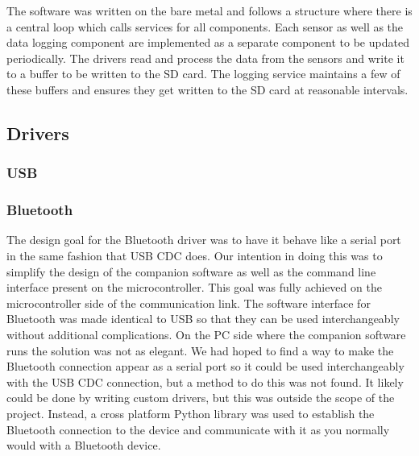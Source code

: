 The software was written on the bare metal and follows a structure where there
is a central loop which calls services for all components.  Each sensor as well
as the data logging component are implemented as a separate component
to be updated periodically. The drivers read and process the data from the
sensors and write it to a buffer to be written to the SD card. The logging service
maintains a few of these buffers and ensures they get written to the SD card
at reasonable intervals.

\subsection{Drivers}

\subsubsection{USB}

\subsubsection{Bluetooth}

The design goal for the Bluetooth driver was to have it behave like a serial
port in the same fashion that USB CDC does. Our intention in doing this was to 
simplify the design of the companion software as well as the command line 
interface present on the microcontroller. This goal was fully achieved 
on the microcontroller side of the communication link. The software interface for 
Bluetooth was made identical to USB so that they can be used interchangeably 
without additional complications. On the PC side where the companion software
runs the solution was not as elegant. We had hoped to find a way to make the
Bluetooth connection appear as a serial port so it could be used interchangeably
with the USB CDC connection, but a method to do this was not found. It likely
could be done by writing custom drivers, but this was outside the scope of the
project. Instead, a cross platform Python library was used to establish the
Bluetooth connection to the device and communicate with it as you normally
would with a Bluetooth device.

